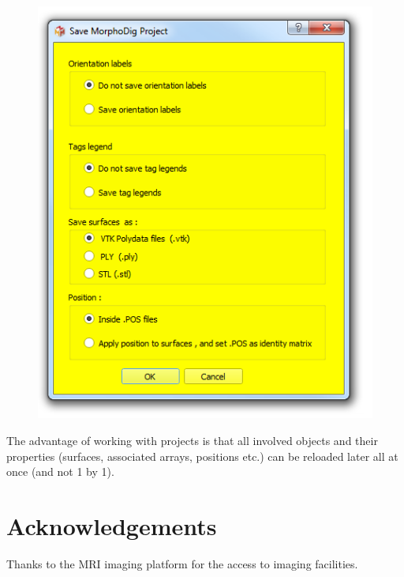 \documentclass[12pt, a4paper]{book}
\begin{document}
\begin{figure}
  \centering  
 \includegraphics[scale=0.5]{../images/07/project/save_ntw.png}
\label{save_project_file}
\end{figure}

The advantage of working with projects is that all involved objects and their properties (surfaces, associated arrays, positions etc.) can be reloaded later all at once (and not 1 by 1). 

\section{Acknowledgements}
Thanks to the MRI imaging platform for the access to imaging facilities.



%  		
\end{document}
